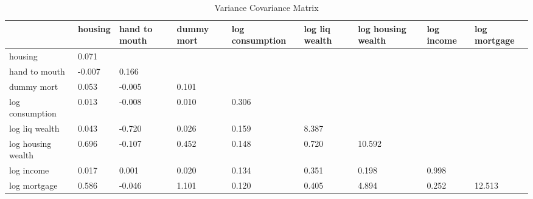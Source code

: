 \begin{table}[htbp]
\caption{\label{clabel} Variance Covariance Matrix}\centering\medskip
\begin{tabular}{lllllllll} \hline \hline
 & housing  & hand to mouth  & dummy mort  & log consumption  & log liq wealth  & log housing wealth  & log income  & log mortgage  \\  \hline 
housing &     0.071 \\  
hand to mouth &    -0.007 &     0.166 \\  
dummy mort &     0.053 &    -0.005 &     0.101 \\  
log consumption &     0.013 &    -0.008 &     0.010 &     0.306 \\  
log liq wealth &     0.043 &    -0.720 &     0.026 &     0.159 &     8.387 \\  
log housing wealth &     0.696 &    -0.107 &     0.452 &     0.148 &     0.720 &    10.592 \\  
log income &     0.017 &     0.001 &     0.020 &     0.134 &     0.351 &     0.198 &     0.998 \\  
log mortgage &     0.586 &    -0.046 &     1.101 &     0.120 &     0.405 &     4.894 &     0.252 &    12.513 \\  
\hline \hline \end{tabular}
\end{table}
